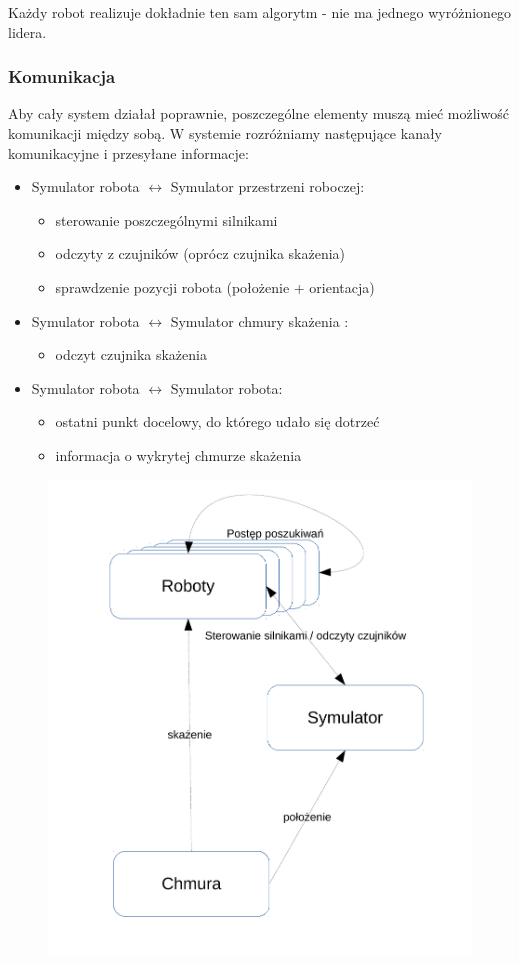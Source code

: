 \documentclass[a4paper, 12pt]{article}
\begin{document}
	Każdy robot realizuje dokładnie ten sam algorytm - nie ma jednego wyróżnionego lidera.
	
	\subsubsection{Komunikacja}
	Aby cały system działał poprawnie, poszczególne elementy muszą mieć możliwość komunikacji między sobą. W systemie rozróżniamy następujące kanały komunikacyjne i przesyłane informacje:
	\begin{itemize}
	\item Symulator robota $\leftrightarrow$ Symulator przestrzeni roboczej:
		\begin{itemize}
		\item sterowanie poszczególnymi silnikami
		\item odczyty z czujników (oprócz czujnika skażenia)
		\item sprawdzenie pozycji robota (położenie + orientacja)
		\end{itemize}
	\item Symulator robota $\leftrightarrow$ Symulator chmury skażenia :
		\begin{itemize}
		\item odczyt czujnika skażenia
		\end{itemize}
	\item Symulator robota $\leftrightarrow$ Symulator robota:
		\begin{itemize}
		\item ostatni punkt docelowy, do którego udało się dotrzeć
		\item informacja o wykrytej chmurze skażenia
		\end{itemize}
	
	\end{itemize}
	
	\begin{figure}[h!]
	\centering
	\includegraphics[width=0.6\columnwidth]{img/system.pdf}
	\end{figure}
	
\end{document}
